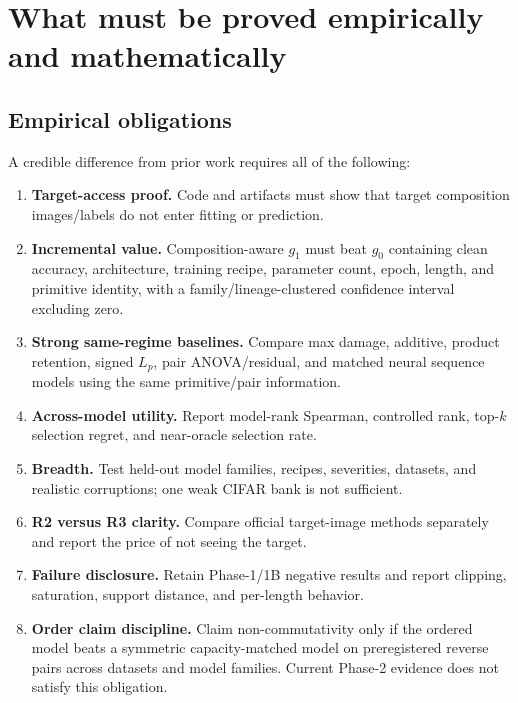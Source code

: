 \documentclass[11pt,a4paper]{article}
\newcommand{\Rtwo}{\mathrm{R2}}
\begin{document}
\section{What must be proved empirically and mathematically}

\subsection{Empirical obligations}

A credible difference from prior work requires all of the following:
\begin{enumerate}
  \item \textbf{Target-access proof.}  Code and artifacts must show that target
  composition images/labels do not enter \Rtwo{} fitting or prediction.
  \item \textbf{Incremental value.}  Composition-aware $g_1$ must beat $g_0$
  containing clean accuracy, architecture, training recipe, parameter count,
  epoch, length, and primitive identity, with a family/lineage-clustered
  confidence interval excluding zero.
  \item \textbf{Strong same-regime baselines.}  Compare max damage, additive,
  product retention, signed $L_p$, pair ANOVA/residual, and matched neural
  sequence models using the same primitive/pair information.
  \item \textbf{Across-model utility.}  Report model-rank Spearman, controlled
  rank, top-$k$ selection regret, and near-oracle selection rate.
  \item \textbf{Breadth.}  Test held-out model families, recipes, severities,
  datasets, and realistic corruptions; one weak CIFAR bank is not sufficient.
  \item \textbf{R2 versus R3 clarity.}  Compare official target-image methods
  separately and report the price of not seeing the target.
  \item \textbf{Failure disclosure.}  Retain Phase-1/1B negative results and
  report clipping, saturation, support distance, and per-length behavior.
  \item \textbf{Order claim discipline.}  Claim non-commutativity only if the
  ordered model beats a symmetric capacity-matched model on preregistered
  reverse pairs across datasets and model families.  Current Phase-2 evidence
  does not satisfy this obligation.
\end{enumerate}
\end{document}
